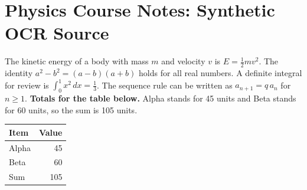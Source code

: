 \documentclass[12pt]{article}
\begin{document}
\section*{Physics Course Notes: Synthetic OCR Source}
The kinetic energy of a body with mass $m$ and velocity $v$ is
$E=\frac{1}{2}mv^{2}$.
The identity $a^2-b^2=(a-b)(a+b)$ holds for all real numbers.
A definite integral for review is $\int_{0}^{1} x^2\,dx=\frac{1}{3}$.
The sequence rule can be written as $a_{n+1}=q\,a_n$ for $n\ge 1$.
\textbf{Totals for the table below.} Alpha stands for 45 units and Beta
stands for 60 units, so the sum is 105 units.
\begin{tabular}{lr}
\hline
Item & Value \\
\hline
Alpha & 45 \\
Beta & 60 \\
Sum & 105 \\
\hline
\end{tabular}
\end{document}

